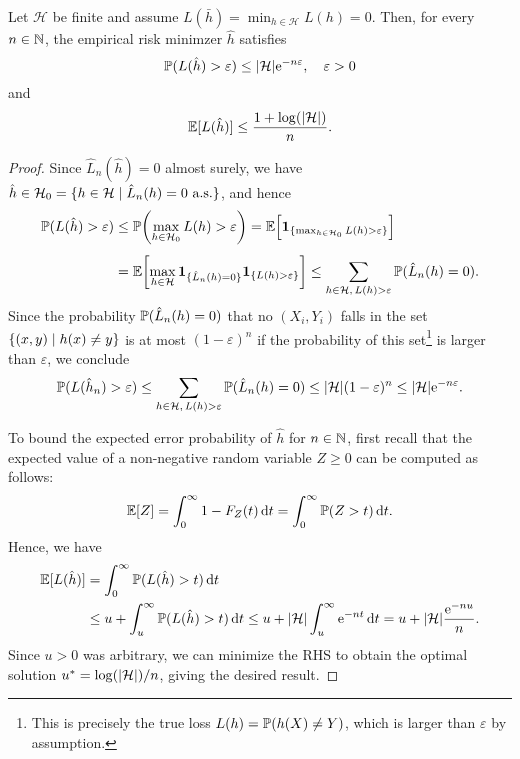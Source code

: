 \begin{theorem}
Let $\mathcal{H}$ be finite and assume $L(\bar{h}) = \min_{h \in \mathcal{H}} L(h) = 0$. Then, for every $n \in \N$, the empirical risk minimzer $\hat{h}$ satisfies
\[
    \P(L(\hat{h}) > \varepsilon) \leq \abs{\mathcal{H}} \e^{-n \varepsilon}, \quad \varepsilon > 0
\]
and
\[
    \Exp[L(\hat{h})] \leq \frac{1 + \log(\abs{\mathcal{H}})}{n}.
\]
\end{theorem}

\begin{proof}
Since $\hat{L}_n(\hat{h}) = 0$ almost surely, we have $\hat{h} \in \mathcal{H}_0 = \{h \in \mathcal{H} \with \hat L_n(h) = 0 \text{ a.s.}\}$, and hence
\begin{align*}
    \P(L(\hat{h}) > \varepsilon) &\leq \P\left(\max_{h \in \mathcal{H}_0} L(h) > \varepsilon\right) = \Exp\left[\ind{\{\max_{h \in \mathcal{H}_0} L(h) > \varepsilon\}}\right] \\[4pt]
    &=\Exp\left[\max_{h \in \mathcal{H}} \ind{\{\hat{L}_n(h) = 0\}} \indSet{L(h) > \varepsilon}\right] \leq \sum_{h \in \mathcal{H}, \, L(h) > \varepsilon} \P(\hat{L}_n(h) = 0).
\end{align*}
Since the probability $\P(\hat{L}_n(h) = 0)$ that no $(X_i, Y_i)$ falls in the set $\set{(x, y) \with h(x) \neq y}$ is at most $(1 - \varepsilon)^n$ if the probability of this set\footnote{This is precisely the true loss $L(h) = \P(h(X) \neq Y)$, which is larger than $\varepsilon$ by assumption.} is larger than $\varepsilon$, we conclude
\[
    \P(L(\hat{h}_n) > \varepsilon) \leq \sum_{h \in \mathcal{H}, \, L(h) > \varepsilon} \P(\hat{L}_n(h) = 0) \leq \abs{\mathcal{H}} (1 - \varepsilon)^n \leq \abs{\mathcal{H}} \e^{-n \varepsilon}.
\]

To bound the expected error probability of $\hat{h}$ for $n \in \N$, first recall that the expected value of a non-negative random variable $Z \geq 0$ can be computed as follows:
\[
    \Exp[Z] = \int_0^{\infty} 1 - F_Z(t) \dt = \int_0^{\infty} \P(Z > t) \dt.
\]
Hence, we have
\begin{align*}
    \Exp[L(\hat{h})] &= \int_0^{\infty} \P(L(\hat{h}) > t) \dt \\
    &\leq u + \int_u^{\infty} \P(L(\hat{h}) > t) \dt \leq u + \abs{\mathcal{H}} \int_u^{\infty} \e^{-nt} \dt = u + \abs{\mathcal{H}} \frac{\e^{-nu}}{n}.
\end{align*}
Since $u > 0$ was arbitrary, we can minimize the RHS to obtain the optimal solution $u^* = \log(\abs{\mathcal{H}}) / n$, giving the desired result.
\end{proof}
